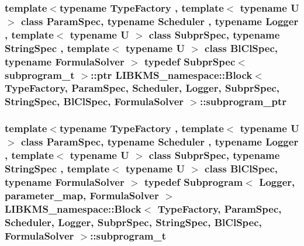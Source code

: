 \hypertarget{classLIBKMS__namespace_1_1Block_aa267fa3009a53828cb55cd853ff4c1b6}{
\subsubsection[{subprogram\-\_\-ptr}]{\setlength{\rightskip}{0pt plus 5cm}template$<$typename Type\-Factory , template$<$ typename U $>$ class Param\-Spec, typename Scheduler , typename Logger , template$<$ typename U $>$ class Subpr\-Spec, typename String\-Spec , template$<$ typename U $>$ class Bl\-Cl\-Spec, typename Formula\-Solver $>$ typedef Subpr\-Spec$<$ {\bf subprogram\-\_\-t} $>$\-::ptr {\bf L\-I\-B\-K\-M\-S\-\_\-namespace\-::\-Block}$<$ {\bf Type\-Factory}, Param\-Spec, Scheduler, Logger, Subpr\-Spec, String\-Spec, Bl\-Cl\-Spec, Formula\-Solver $>$\-::{\bf subprogram\-\_\-ptr}}}\label{classLIBKMS__namespace_1_1Block_aa267fa3009a53828cb55cd853ff4c1b6}
\hypertarget{classLIBKMS__namespace_1_1Block_a89ead8d5558038ca06b862f1988c3d1a}{
\subsubsection[{subprogram\-\_\-t}]{\setlength{\rightskip}{0pt plus 5cm}template$<$typename Type\-Factory , template$<$ typename U $>$ class Param\-Spec, typename Scheduler , typename Logger , template$<$ typename U $>$ class Subpr\-Spec, typename String\-Spec , template$<$ typename U $>$ class Bl\-Cl\-Spec, typename Formula\-Solver $>$ typedef {\bf Subprogram}$<$ Logger, {\bf parameter\-\_\-map}, Formula\-Solver $>$ {\bf L\-I\-B\-K\-M\-S\-\_\-namespace\-::\-Block}$<$ {\bf Type\-Factory}, Param\-Spec, Scheduler, Logger, Subpr\-Spec, String\-Spec, Bl\-Cl\-Spec, Formula\-Solver $>$\-::{\bf subprogram\-\_\-t}}}\label{classLIBKMS__namespace_1_1Block_a89ead8d5558038ca06b862f1988c3d1a}
